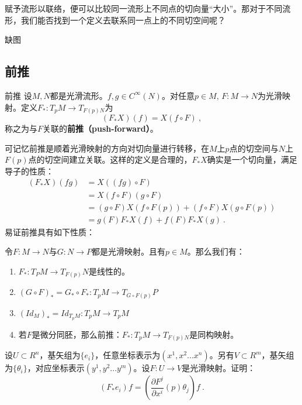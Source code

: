 赋予流形以联络，便可以比较同一流形上不同点的切向量“大小”。那对于不同流形，我们能否找到一个定义去联系同一点上的不同切空间呢？

\begin{issues}
\issueDraft 缺图
\end{issues}

\subsection{前推}
\begin{definition}{前推}
设$M,N$都是光滑流形。$f,g\in C^{\infty}(N)$。对任意$p\in M,\,F:M\rightarrow N$为光滑映射。定义$F_*:T_p M\rightarrow T_{F(p)N}$为
\begin{equation}
(F_*X)(f)=X(f\circ F)~,
\end{equation}
称之为与$F$关联的\textbf{前推（push-forward）}。
\end{definition}
可记忆前推是顺着光滑映射的方向对切向量进行转移，在$M$上$p$点的切空间与$N$上$F(p)$点的切空间建立关联。这样的定义是合理的，$F_*X$确实是一个切向量，满足导子的性质：
\begin{equation}
\begin{aligned}
(F_*X)(fg)&=X((fg)\circ F)\\
&=X(f\circ F)(g\circ F)\\
&=(g\circ F)X(f\circ F(p))+(f\circ F)X(g\circ F(p))\\
&=g(F)F_*X(f)+f(F)F_*X(g)~.
\end{aligned}
\end{equation}
易证前推具有如下性质：
\begin{lemma}{}
令$F:M\rightarrow N$与$G:N\rightarrow P$都是光滑映射。且有$p\in M$。那么我们有：
\begin{enumerate}
\item $F_*:T_P M\rightarrow T_{F(p)}N$是线性的。
\item $(G\circ F)_*=G_*\circ F_*:T_p M\rightarrow T_{G\circ F(p)}P$
\item $(Id_M)_*=Id_{T_p M}:T_p M\rightarrow T_p M$
\item 若$F$是微分同胚，那么前推：$F_*: T_p M\rightarrow T_{F(p)N}$是同构映射。
\end{enumerate}
\end{lemma}

\begin{exercise}{}
设$U\subset R^n$，基矢组为$\{e_i\}$，任意坐标表示为$(x^1,x^2...x^n)$。另有$V\subset R^m$，基矢组为$\{\theta_i\}$，对应坐标表示$(y^1,y^2...y^m)$。设$F:U\rightarrow V$是光滑映射。证明：
\begin{equation}
(F_*e_i)f=(\frac{\partial F^j}{\partial x^i}(p)\theta_j)f~.
\end{equation}

\end{exercise}
